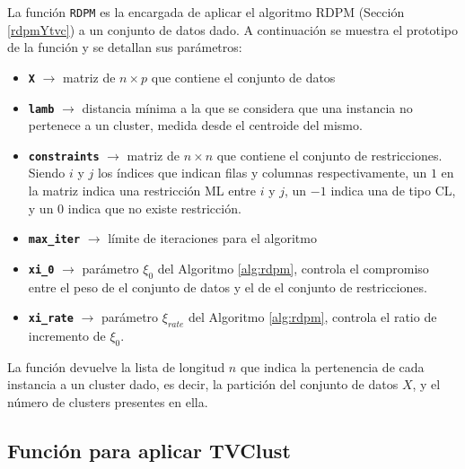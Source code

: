 La función \texttt{RDPM} es la encargada de aplicar el algoritmo \acs{RDPM} (Sección \ref{rdpmYtvc}) a un conjunto de datos dado. A continuación se muestra el prototipo de la función y se detallan sus parámetros:


\begin{itemize}
	
	\item \textbf{\texttt{X}} {$\longrightarrow$ matriz de $n \times p$ que contiene el conjunto de datos}
	
	\item \textbf{\texttt{lamb}} {$\longrightarrow$ distancia mínima a la que se considera que una instancia no pertenece a un cluster, medida desde el centroide del mismo.}
	
	\item \textbf{\texttt{constraints}} {$\longrightarrow$ matriz de $n \times n$ que contiene el conjunto de restricciones. Siendo $i$ y $j$ los índices que indican filas y columnas respectivamente, un $1$ en la matriz indica una restricción \acs{ML} entre $i$ y $j$, un $-1$ indica una de tipo \acs{CL}, y un $0$ indica que no existe restricción.}
	
	\item \textbf{\texttt{max\_iter}} {$\longrightarrow$ límite de iteraciones para el algoritmo}
	
	\item \textbf{\texttt{xi\_0}} {$\longrightarrow$ parámetro $\xi_0$ del Algoritmo \ref{alg:rdpm}, controla el compromiso entre el peso de el conjunto de datos y el de el conjunto de restricciones.}
	
	\item \textbf{\texttt{xi\_rate}} {$\longrightarrow$ parámetro $\xi_{rate}$ del Algoritmo \ref{alg:rdpm}, controla el ratio de incremento de $\xi_0$.}
	
\end{itemize}

La función devuelve la lista de longitud $n$ que indica la pertenencia de cada instancia a un cluster dado, es decir, la partición del conjunto de datos $X$, y el número de clusters presentes en ella.

\subsection{Función para aplicar TVClust}


